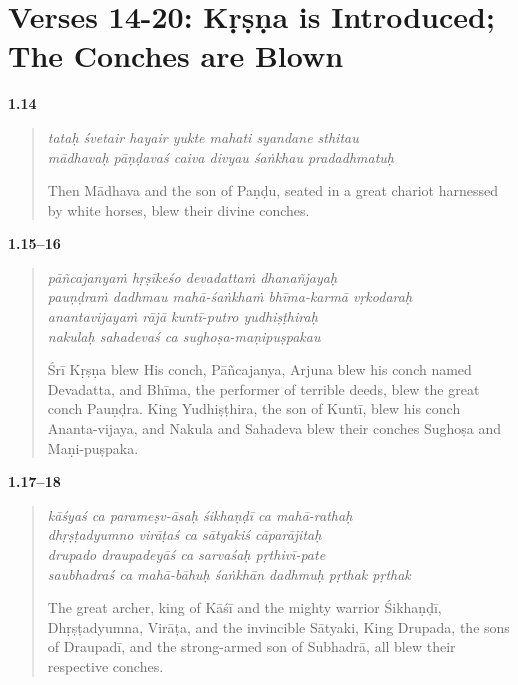 \section{Verses 14-20: Kṛṣṇa is Introduced; The Conches are Blown}\label{sec-verses-14-20-krsna-is-introduced-the-conches-are-blown}


\par\noindent\textbf{1.14}\par
\begin{verse}
\textit{tataḥ śvetair hayair yukte mahati syandane sthitau} \\
\textit{mādhavaḥ pāṇḍavaś caiva divyau śaṅkhau pradadhmatuḥ}

\noindent Then Mādhava and the son of Paṇḍu, seated in a great chariot harnessed by white horses, blew their divine conches.
\end{verse}
\par



\par\noindent\textbf{1.15–16}\par
\begin{verse}
\textit{pāñcajanyaṁ hṛṣīkeśo devadattaṁ dhanañjayaḥ} \\
\textit{pauṇḍraṁ dadhmau mahā-śaṅkhaṁ bhīma-karmā vṛkodaraḥ} \\
\textit{anantavijayaṁ rājā kuntī-putro yudhiṣṭhiraḥ} \\
\textit{nakulaḥ sahadevaś ca sughoṣa-maṇipuṣpakau}

\noindent Śrī Kṛṣṇa blew His conch, Pāñcajanya, Arjuna blew his conch named Devadatta, and Bhīma, the performer of terrible deeds, blew the great conch Pauṇḍra. King Yudhiṣṭhira, the son of Kuntī, blew his conch Ananta-vijaya, and Nakula and Sahadeva blew their conches Sughoṣa and Maṇi-puṣpaka.
\end{verse}
\par



\par\noindent\textbf{1.17–18}\par
\begin{verse}
\textit{kāśyaś ca parameṣv-āsaḥ śikhaṇḍī ca mahā-rathaḥ} \\
\textit{dhṛṣṭadyumno virāṭaś ca sātyakiś cāparājitaḥ} \\
\textit{drupado draupadeyāś ca sarvaśaḥ pṛthivī-pate} \\
\textit{saubhadraś ca mahā-bāhuḥ śaṅkhān dadhmuḥ pṛthak pṛthak}

\noindent The great archer, king of Kāśī and the mighty warrior Śikhaṇḍī, Dhṛṣṭadyumna, Virāṭa, and the invincible Sātyaki, King Drupada, the sons of Draupadī, and the strong-armed son of Subhadrā, all blew their respective conches.
\end{verse}
\par



